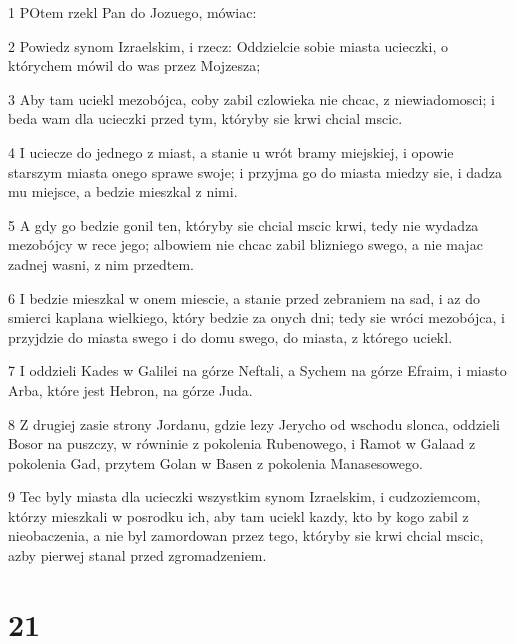 \par 1 POtem rzekl Pan do Jozuego, mówiac:
\par 2 Powiedz synom Izraelskim, i rzecz: Oddzielcie sobie miasta ucieczki, o którychem mówil do was przez Mojzesza;
\par 3 Aby tam uciekl mezobójca, coby zabil czlowieka nie chcac, z niewiadomosci; i beda wam dla ucieczki przed tym, któryby sie krwi chcial mscic.
\par 4 I uciecze do jednego z miast, a stanie u wrót bramy miejskiej, i opowie starszym miasta onego sprawe swoje; i przyjma go do miasta miedzy sie, i dadza mu miejsce, a bedzie mieszkal z nimi.
\par 5 A gdy go bedzie gonil ten, któryby sie chcial mscic krwi, tedy nie wydadza mezobójcy w rece jego; albowiem nie chcac zabil blizniego swego, a nie majac zadnej wasni, z nim przedtem.
\par 6 I bedzie mieszkal w onem miescie, a stanie przed zebraniem na sad, i az do smierci kaplana wielkiego, który bedzie za onych dni; tedy sie wróci mezobójca, i przyjdzie do miasta swego i do domu swego, do miasta, z którego uciekl.
\par 7 I oddzieli Kades w Galilei na górze Neftali, a Sychem na górze Efraim, i miasto Arba, które jest Hebron, na górze Juda.
\par 8 Z drugiej zasie strony Jordanu, gdzie lezy Jerycho od wschodu slonca, oddzieli Bosor na puszczy, w równinie z pokolenia Rubenowego, i Ramot w Galaad z pokolenia Gad, przytem Golan w Basen z pokolenia Manasesowego.
\par 9 Tec byly miasta dla ucieczki wszystkim synom Izraelskim, i cudzoziemcom, którzy mieszkali w posrodku ich, aby tam uciekl kazdy, kto by kogo zabil z nieobaczenia, a nie byl zamordowan przez tego, któryby sie krwi chcial mscic, azby pierwej stanal przed zgromadzeniem.

\chapter{21}


